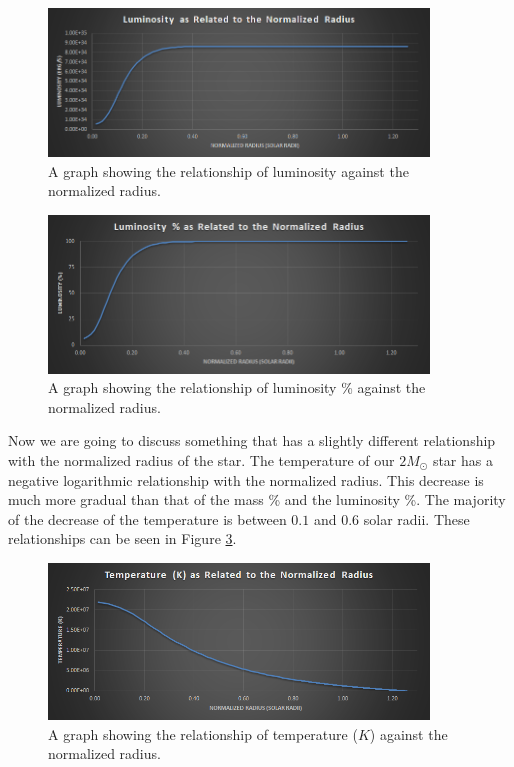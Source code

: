 \documentclass{article}
\begin{document}
\begin{figure}
  \centering
  \includegraphics[width=0.9\textwidth]{lumino.png}
  \caption{A graph showing the relationship of luminosity against the normalized radius.}
  \label{fig:lumino}
\end{figure}
\begin{figure}
  \centering
  \includegraphics[width=0.9\textwidth]{lumin.png}
  \caption{A graph showing the relationship of luminosity \% against the normalized radius.}
  \label{fig:lumin}
\end{figure}

\begin{multicols}{2}

Now we are going to discuss something that has a slightly different relationship with the normalized radius of the star. The temperature of our $2M_\odot$ star has a negative logarithmic relationship with the normalized radius. This decrease is much more gradual than that of the mass \% and the luminosity \%. The majority of the decrease of the temperature is between $0.1$ and $0.6$ solar radii. These relationships can be seen in Figure \ref{fig:temp}. 

\end{multicols}

\begin{figure}
  \centering
  \includegraphics[width=0.9\textwidth]{temp.png}
  \caption{A graph showing the relationship of temperature ($K$) against the normalized radius.}
  \label{fig:temp}
\end{figure}
\end{document}
